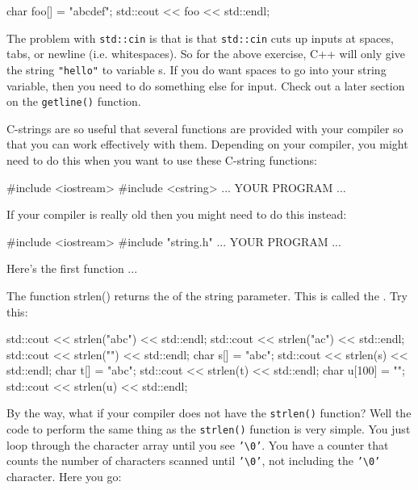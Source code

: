 \begin{consolethree}[escapeinside=||]
char foo[] = "abcdef";
std::cout << foo << std::endl;
\end{consolethree}




The problem with \texttt{std::cin} is that is that \texttt{std::cin} cuts up inputs at spaces, tabs, or newline (i.e. whitespaces). So for the above exercise, C++ will only give the string \texttt{"hello"} to variable s. If you do want spaces to go into your string variable, then you need to do something else for input. Check out a later section on the \texttt{getline()} function.


\newpage{}

C-strings are so useful that several functions are provided with your compiler so that you can work effectively with them. Depending on your compiler, you might need to do this when you want to use these C-string functions:

\begin{consolethree}[escapeinside=||]
#include <iostream>
#include <cstring>
... YOUR PROGRAM ...
\end{consolethree}

If your compiler is really old then you might need to do this instead:

\begin{consolethree}[escapeinside=||]
#include <iostream>
#include "string.h"
... YOUR PROGRAM ...
\end{consolethree}

Here's the first function ...

The function strlen() returns the  of the string parameter. This is called the . Try this:

\begin{consolethree}[escapeinside=||]
std::cout << strlen("abc") << std::endl;
std::cout << strlen("a\0c") << std::endl;
std::cout << strlen("") << std::endl;
char s[] = "abc";
std::cout << strlen(s) << std::endl;
char t[] = "ab\0c";
std::cout << strlen(t) << std::endl;
char u[100] = "";
std::cout << strlen(u) << std::endl;
\end{consolethree}

By the way, what if your compiler does not have the \verb!strlen()! function? Well the code to perform the same thing as the \verb!strlen()! function is very simple. You just loop through the character array until you see \texttt{'\textbackslash 0'}. You have a counter that counts the number of characters scanned until \texttt{'\textbackslash 0'}, not including the \texttt{'\textbackslash 0'} character. Here you go:

